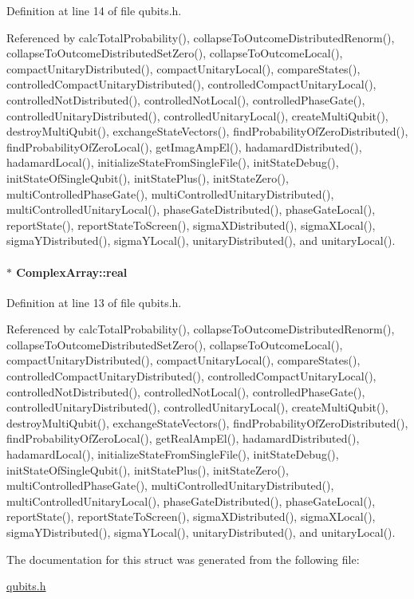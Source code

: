 Definition at line 14 of file qubits.\+h.



Referenced by calc\+Total\+Probability(), collapse\+To\+Outcome\+Distributed\+Renorm(), collapse\+To\+Outcome\+Distributed\+Set\+Zero(), collapse\+To\+Outcome\+Local(), compact\+Unitary\+Distributed(), compact\+Unitary\+Local(), compare\+States(), controlled\+Compact\+Unitary\+Distributed(), controlled\+Compact\+Unitary\+Local(), controlled\+Not\+Distributed(), controlled\+Not\+Local(), controlled\+Phase\+Gate(), controlled\+Unitary\+Distributed(), controlled\+Unitary\+Local(), create\+Multi\+Qubit(), destroy\+Multi\+Qubit(), exchange\+State\+Vectors(), find\+Probability\+Of\+Zero\+Distributed(), find\+Probability\+Of\+Zero\+Local(), get\+Imag\+Amp\+El(), hadamard\+Distributed(), hadamard\+Local(), initialize\+State\+From\+Single\+File(), init\+State\+Debug(), init\+State\+Of\+Single\+Qubit(), init\+State\+Plus(), init\+State\+Zero(), multi\+Controlled\+Phase\+Gate(), multi\+Controlled\+Unitary\+Distributed(), multi\+Controlled\+Unitary\+Local(), phase\+Gate\+Distributed(), phase\+Gate\+Local(), report\+State(), report\+State\+To\+Screen(), sigma\+X\+Distributed(), sigma\+X\+Local(), sigma\+Y\+Distributed(), sigma\+Y\+Local(), unitary\+Distributed(), and unitary\+Local().

\paragraph[{\texorpdfstring{real}{real}}]{$\ast$ Complex\+Array\+::real}\hypertarget{structComplexArray_a4195cac6c784ea1b6271f1c7dba1548a}{}\label{structComplexArray_a4195cac6c784ea1b6271f1c7dba1548a}


Definition at line 13 of file qubits.\+h.



Referenced by calc\+Total\+Probability(), collapse\+To\+Outcome\+Distributed\+Renorm(), collapse\+To\+Outcome\+Distributed\+Set\+Zero(), collapse\+To\+Outcome\+Local(), compact\+Unitary\+Distributed(), compact\+Unitary\+Local(), compare\+States(), controlled\+Compact\+Unitary\+Distributed(), controlled\+Compact\+Unitary\+Local(), controlled\+Not\+Distributed(), controlled\+Not\+Local(), controlled\+Phase\+Gate(), controlled\+Unitary\+Distributed(), controlled\+Unitary\+Local(), create\+Multi\+Qubit(), destroy\+Multi\+Qubit(), exchange\+State\+Vectors(), find\+Probability\+Of\+Zero\+Distributed(), find\+Probability\+Of\+Zero\+Local(), get\+Real\+Amp\+El(), hadamard\+Distributed(), hadamard\+Local(), initialize\+State\+From\+Single\+File(), init\+State\+Debug(), init\+State\+Of\+Single\+Qubit(), init\+State\+Plus(), init\+State\+Zero(), multi\+Controlled\+Phase\+Gate(), multi\+Controlled\+Unitary\+Distributed(), multi\+Controlled\+Unitary\+Local(), phase\+Gate\+Distributed(), phase\+Gate\+Local(), report\+State(), report\+State\+To\+Screen(), sigma\+X\+Distributed(), sigma\+X\+Local(), sigma\+Y\+Distributed(), sigma\+Y\+Local(), unitary\+Distributed(), and unitary\+Local().



The documentation for this struct was generated from the following file\+:\begin{DoxyCompactItemize}
\item 
\hyperlink{qubits_8h}{qubits.\+h}\end{DoxyCompactItemize}
